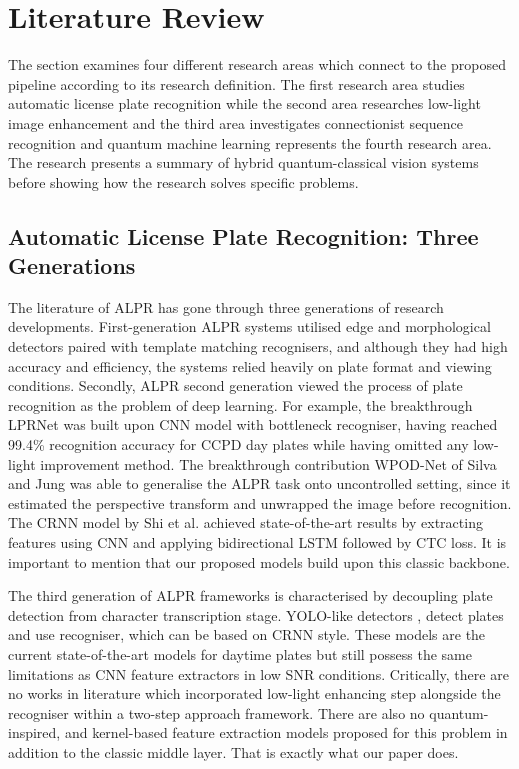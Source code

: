 \documentclass{ieeeaccess}
\begin{document}
\section{Literature Review}
The section examines four different research areas which connect to the proposed pipeline according to its research definition. The first research area studies automatic license plate recognition while the second area researches low-light image enhancement and the third area investigates connectionist sequence recognition and quantum machine learning represents the fourth research area. The research presents a summary of hybrid quantum-classical vision systems before showing how the research solves specific problems.

\subsection{Automatic License Plate Recognition: Three Generations}
The literature of ALPR has gone through three generations of research developments. First-generation ALPR systems utilised edge and morphological detectors paired with template matching recognisers, and although they had high accuracy and efficiency, the systems relied heavily on plate format and viewing conditions. Secondly, ALPR second generation viewed the process of plate recognition as the problem of deep learning. For example, the breakthrough LPRNet \cite{b14} was built upon CNN model with bottleneck recogniser, having reached 99.4\% recognition accuracy for CCPD day plates while having omitted any low-light improvement method. The breakthrough contribution WPOD-Net of Silva and Jung \cite{b13} was able to generalise the ALPR task onto uncontrolled setting, since it estimated the perspective transform and unwrapped the image before recognition. The CRNN model \cite{b12} by Shi et al. achieved state-of-the-art results by extracting features using CNN and applying bidirectional LSTM followed by CTC \cite{b3} loss. It is important to mention that our proposed models build upon this classic backbone.

The third generation of ALPR frameworks is characterised by decoupling plate detection from character transcription stage. YOLO-like detectors \cite{b15}, \cite{b16} detect plates and use recogniser, which can be based on CRNN style. These models are the current state-of-the-art models for daytime plates but still possess the same limitations as CNN feature extractors in low SNR conditions. Critically, there are no works in literature which incorporated low-light enhancing step alongside the recogniser within a two-step approach framework. There are also no quantum-inspired, and kernel-based feature extraction models proposed for this problem in addition to the classic middle layer. That is exactly what our paper does.
\end{document}
